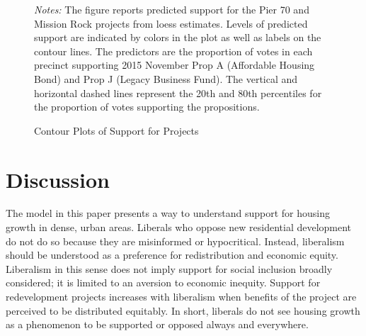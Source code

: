 \documentclass[article,11pt]{memoir}
\begin{document}
\begin{figure}[t]
  \caption{Contour Plots of Support for Projects}
  \label{fig:g_contour}
  \begin{measuredfigure}
  \end{measuredfigure}
  \begin{tablenotes}[flushleft]
    \item \hspace{-.2em}\emph{Notes:} The figure reports predicted support for the Pier 70 and Mission Rock projects from loess estimates.  Levels of predicted support are indicated by colors in the plot as well as labels on the contour lines.  The predictors are the proportion of votes in each precinct supporting 2015 November Prop A (Affordable Housing Bond) and Prop J (Legacy Business Fund).  The vertical and horizontal dashed lines represent the 20th and 80th percentiles for the proportion of votes supporting the propositions.
  \end{tablenotes}
\end{figure}

\section{Discussion}\label{sec:discussion}

The model in this paper presents a way to understand support for housing growth in dense, urban areas.  Liberals who oppose new residential development do not do so because they are misinformed or hypocritical. Instead, liberalism should be understood as a preference for redistribution and economic equity.  Liberalism in this sense does not imply support for social inclusion broadly considered; it is limited to an aversion to economic inequity. Support for redevelopment projects increases with liberalism when benefits of the project are perceived to be distributed equitably. In short, liberals do not see housing growth as a phenomenon to be supported or opposed always and everywhere.
\end{document}
